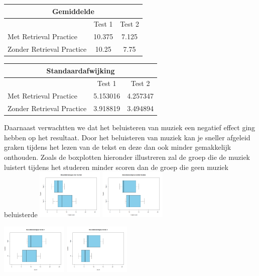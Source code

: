 \documentclass{hogent-article}
\begin{document}
	\begin{tabular}{ |p{10em}|c|c| }
	\hline
		\multicolumn{3}{|c|}{Gemiddelde} \\
	\hline
		& Test 1 & Test 2 \\
	\hline
		Met Retrieval Practice & 10.375 & 7.125 \\
		Zonder Retrieval Practice & 10.25 & 7.75 \\
	\hline
	\end{tabular}
	
	\begin{tabular}{ |p{10em}|c|c| }
	\hline
		\multicolumn{3}{|c|}{Standaardafwijking} \\
	\hline
		& Test 1 & Test 2 \\
	\hline
		Met Retrieval Practice & 5.153016 & 4.257347 \\
		Zonder Retrieval Practice & 3.918819 & 3.494894 \\
	\hline
	\end{tabular}
	
	Daarnaast verwachtten we dat het beluisteren van muziek een negatief effect ging hebben op het resultaat. Door het beluisteren van muziek kan je sneller afgeleid graken tijdens het lezen van de tekst en deze dan ook minder gemakkelijk onthouden. Zoals de boxplotten hieronder illustreren zal de groep die de muziek luistert tijdens het studeren minder scoren dan de groep die geen muziek beluisterde
	\includegraphics[width=120px]{Verwacht_Muziek}
	\includegraphics[width=120px]{Verwacht_ZonderMuziek}
	
	\includegraphics[width=120px]{Verwacht_Muziek_Score1}
	\includegraphics[width=120px]{Verwacht_Muziek_Score2}
	
\end{document}
